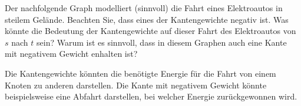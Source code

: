 \begin{myexercise}\label{aufgabe:203}
	Der nachfolgende Graph modelliert (sinnvoll) die Fahrt eines Elektroautos in steilem Gelände. Beachten Sie, dass eines der Kantengewichte negativ ist. Was könnte die Bedeutung der Kantengewichte auf dieser Fahrt des Elektroautos von $s$ nach $t$ sein? Warum ist es sinnvoll, dass in diesem Graphen auch eine Kante mit negativem Gewicht enhalten ist?
	\begin{figure}[H]
		\centering
	\end{figure}
	\begin{myanswer}\label{aufgabe:203-sol}
		Die Kantengewichte könnten die benötigte Energie für die Fahrt von einem Knoten zu anderen darstellen. Die Kante mit negativem Gewicht könnte beispielsweise eine Abfahrt darstellen, bei welcher Energie zurückgewonnen wird.
	\end{myanswer}
\end{myexercise}


